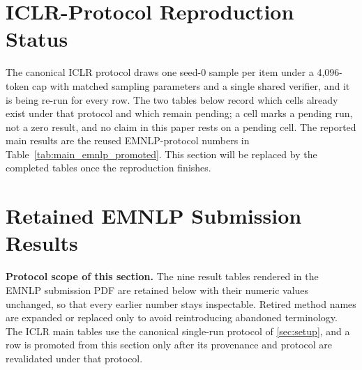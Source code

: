 


\section{ICLR-Protocol Reproduction Status}
\label{app:iclr_protocol_status}

The canonical ICLR protocol draws one seed-0 sample per item under a 4,096-token cap with matched sampling parameters and a single shared verifier, and it is being re-run for every row. The two tables below record which cells already exist under that protocol and which remain pending; a \tbd{--} cell marks a pending run, not a zero result, and no claim in this paper rests on a pending cell. The reported main results are the reused EMNLP-protocol numbers in Table~\ref{tab:main_emnlp_promoted}. This section will be replaced by the completed tables once the reproduction finishes.



\clearpage
\section{Retained EMNLP Submission Results}
\label{app:legacy_emnlp_results}

\noindent\textbf{Protocol scope of this section.} The nine result tables rendered in the EMNLP submission PDF are retained below with their numeric values unchanged, so that every earlier number stays inspectable. Retired method names are expanded or replaced only to avoid reintroducing abandoned terminology.  The ICLR main tables use the canonical single-run protocol of \cref{sec:setup}, and a row is promoted from this section only after its provenance and protocol are revalidated under that protocol.

